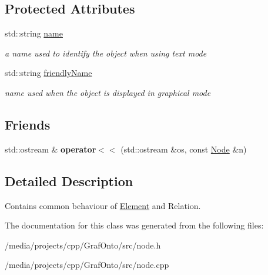 \subsection*{\-Protected \-Attributes}
\begin{DoxyCompactItemize}
\item 
\hypertarget{class_node_aa829edc37a2c92dacdab95bcef248175}{std\-::string \hyperlink{class_node_aa829edc37a2c92dacdab95bcef248175}{name}}\label{class_node_aa829edc37a2c92dacdab95bcef248175}

\begin{DoxyCompactList}\small\item\em a name used to identify the object when using text mode \end{DoxyCompactList}\item 
\hypertarget{class_node_a157acddebd6860eccdc8495039db161f}{std\-::string \hyperlink{class_node_a157acddebd6860eccdc8495039db161f}{friendly\-Name}}\label{class_node_a157acddebd6860eccdc8495039db161f}

\begin{DoxyCompactList}\small\item\em name used when the object is displayed in graphical mode \end{DoxyCompactList}\end{DoxyCompactItemize}
\subsection*{\-Friends}
\begin{DoxyCompactItemize}
\item 
\hypertarget{class_node_a6fe565f8d6d1c1d44540c07e92864c91}{std\-::ostream \& {\bfseries operator$<$$<$} (std\-::ostream \&os, const \hyperlink{class_node}{\-Node} \&n)}\label{class_node_a6fe565f8d6d1c1d44540c07e92864c91}

\end{DoxyCompactItemize}


\subsection{\-Detailed \-Description}
\-Contains common behaviour of \hyperlink{class_element}{\-Element} and \-Relation. 

\-The documentation for this class was generated from the following files\-:\begin{DoxyCompactItemize}
\item 
/media/projects/cpp/\-Graf\-Onto/src/node.\-h\item 
/media/projects/cpp/\-Graf\-Onto/src/node.\-cpp\end{DoxyCompactItemize}
